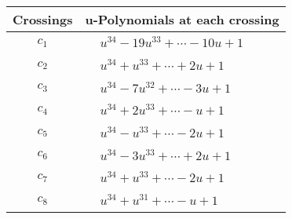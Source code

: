 \documentclass[1p]{elsarticle_modified}
\theoremstyle{definition}
\begin{document}
\begin{tabular}{m{50pt}|m{274pt}}
Crossings & \hspace{64pt}u-Polynomials at each crossing \\
\hline $$\begin{aligned}c_{1}\end{aligned}$$&$\begin{aligned}
&u^{34}-19 u^{33}+\cdots-10 u+1
\end{aligned}$\\
\hline $$\begin{aligned}c_{2}\end{aligned}$$&$\begin{aligned}
&u^{34}+u^{33}+\cdots+2 u+1
\end{aligned}$\\
\hline $$\begin{aligned}c_{3}\end{aligned}$$&$\begin{aligned}
&u^{34}-7 u^{32}+\cdots-3 u+1
\end{aligned}$\\
\hline $$\begin{aligned}c_{4}\end{aligned}$$&$\begin{aligned}
&u^{34}+2 u^{33}+\cdots- u+1
\end{aligned}$\\
\hline $$\begin{aligned}c_{5}\end{aligned}$$&$\begin{aligned}
&u^{34}- u^{33}+\cdots-2 u+1
\end{aligned}$\\
\hline $$\begin{aligned}c_{6}\end{aligned}$$&$\begin{aligned}
&u^{34}-3 u^{33}+\cdots+2 u+1
\end{aligned}$\\
\hline $$\begin{aligned}c_{7}\end{aligned}$$&$\begin{aligned}
&u^{34}+u^{33}+\cdots-2 u+1
\end{aligned}$\\
\hline $$\begin{aligned}c_{8}\end{aligned}$$&$\begin{aligned}
&u^{34}+u^{31}+\cdots- u+1
\end{aligned}$\\

\end{tabular}
\end{document}
